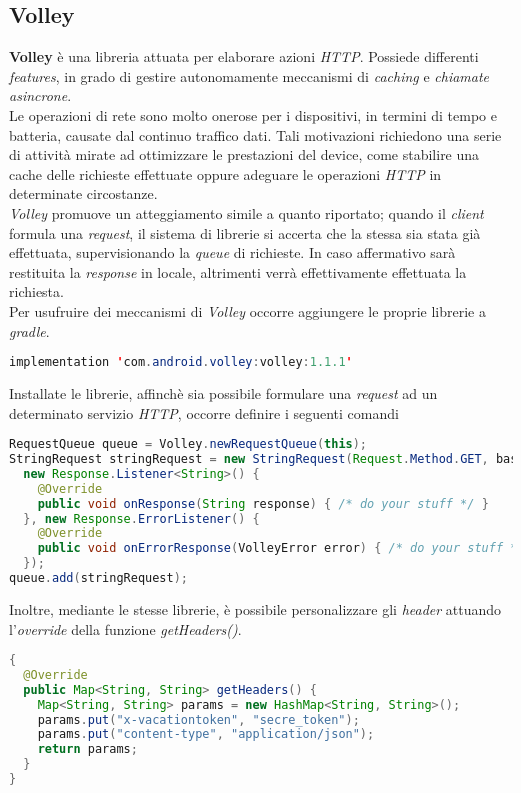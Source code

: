 \documentclass{article}
\begin{document}
\subsection*{Volley}
\textbf{Volley} è una libreria attuata per elaborare azioni \textit{HTTP}. Possiede differenti \textit{features}, in grado di gestire autonomamente meccanismi di \textit{caching} e \textit{chiamate asincrone}.\vspace*{7pt}\\
Le operazioni di rete sono molto onerose per i dispositivi, in termini di tempo e batteria, causate dal continuo traffico dati. Tali motivazioni richiedono una serie di attività mirate ad ottimizzare le prestazioni del device, come stabilire una cache delle richieste effettuate oppure adeguare le operazioni \textit{HTTP} in determinate circostanze.\vspace*{7pt}\\
\textit{Volley} promuove un atteggiamento simile a quanto riportato; quando il \textit{client} formula una \textit{request}, il sistema di librerie si accerta che la stessa sia stata già effettuata, supervisionando la \textit{queue} di richieste. In caso affermativo sarà restituita la \textit{response} in locale, altrimenti verrà effettivamente effettuata la richiesta.\vspace*{7pt}\\
Per usufruire dei meccanismi di \textit{Volley} occorre aggiungere le proprie librerie a \textit{gradle}.
\begin{lstlisting}[language=JAVA]
implementation 'com.android.volley:volley:1.1.1'
\end{lstlisting}   
Installate le librerie, affinchè sia possibile formulare una \textit{request} ad un determinato servizio \textit{HTTP}, occorre definire i seguenti comandi
\begin{lstlisting}[language=JAVA]
RequestQueue queue = Volley.newRequestQueue(this);
StringRequest stringRequest = new StringRequest(Request.Method.GET, baseUrl, 
  new Response.Listener<String>() {
    @Override
    public void onResponse(String response) { /* do your stuff */ } 
  }, new Response.ErrorListener() {
    @Override
    public void onErrorResponse(VolleyError error) { /* do your stuff */ } 
  });
queue.add(stringRequest);
\end{lstlisting}
Inoltre, mediante le stesse librerie, è possibile personalizzare gli \textit{header} attuando l'\textit{override} della funzione \textit{getHeaders()}.
\begin{lstlisting}[language=JAVA]
{
  @Override
  public Map<String, String> getHeaders() {
    Map<String, String> params = new HashMap<String, String>();
    params.put("x-vacationtoken", "secre_token");
    params.put("content-type", "application/json");
    return params;
  }
}
\end{lstlisting}
\end{document}
